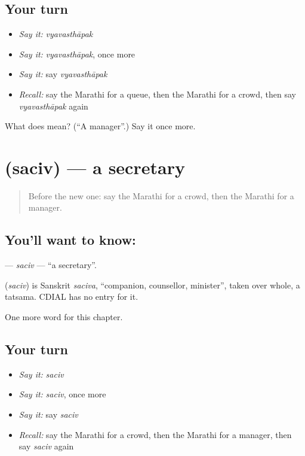 \subsection*{Your turn}
\begin{itemize}
\raggedright
  \item \emph{Say it:} \emph{vyavasthāpak}
  \item \emph{Say it:} \emph{vyavasthāpak}, once more
  \item \emph{Say it:} say \emph{vyavasthāpak}
  \item \emph{Recall:} say the Marathi for a queue, then the Marathi for a crowd, then say \emph{vyavasthāpak} again
\end{itemize}

\begin{tcolorbox}[breakable,colback=teal!4,colframe=teal!35!black,title={Before you move on}]
What does  mean? (\textquotedblleft{}A manager\textquotedblright{}.) Say it once more.
\end{tcolorbox}
\section[\texorpdfstring{\mr{सचिव} (saciv)}{सचिव (saciv)}]{ (saciv) — a secretary}

\label{lesson:MR-C191-saciv}



\begin{quote}
Before the new one: say the Marathi for a crowd, then the Marathi for a manager.
\end{quote}

\subsection*{You'll want to know: }
\textbf{} — \emph{saciv} — \textquotedblleft{}a secretary\textquotedblright{}.

\begin{cousinweb}
\textbf{} (\emph{saciv}) is Sanskrit \emph{saciva}, \textquotedblleft{}companion, counsellor, minister\textquotedblright{}, taken over whole, a tatsama. CDIAL has no entry for it.
\end{cousinweb}

\begin{grammarlens}[title={What you've built}]
One more word for this chapter.
\end{grammarlens}

\subsection*{Your turn}
\begin{itemize}
\raggedright
  \item \emph{Say it:} \emph{saciv}
  \item \emph{Say it:} \emph{saciv}, once more
  \item \emph{Say it:} say \emph{saciv}
  \item \emph{Recall:} say the Marathi for a crowd, then the Marathi for a manager, then say \emph{saciv} again
\end{itemize}

